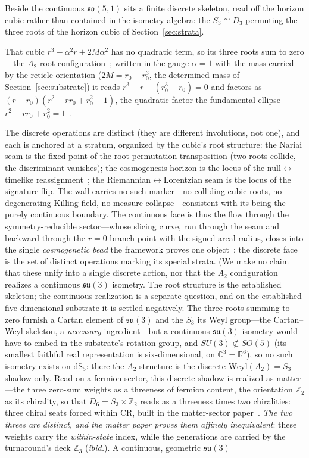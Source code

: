 \documentclass[11pt,a4paper]{article}
\theoremstyle{plain}
\theoremstyle{definition}
\theoremstyle{remark}
\newcommand{\so}{\mathfrak{so}}
\newcommand{\dS}{\mathrm{dS}}
\begin{document}
Beside the continuous $\so(5,1)$ sits a finite discrete skeleton, read off the horizon cubic rather than contained in the isometry algebra: the $S_3\cong D_3$ permuting the three roots of the horizon cubic of Section~\ref{sec:strata}. 

That cubic $r^3-\alpha^2 r+2M\alpha^2$ has no quadratic term, so its three roots sum to zero---the $A_2$ root configuration~\cite{Humphreys1972}; written in the gauge $\alpha=1$ with the mass carried by the reticle orientation ($2M=r_0-r_0^3$, the determined mass of Section~\ref{sec:substrate}) it reads $r^3-r-(r_0^3-r_0)=0$ and factors as $(r-r_0)(r^2+r r_0+r_0^2-1)$, the quadratic factor the fundamental ellipse $r^2+r r_0+r_0^2=1$~\cite{JanzenGroupoid,JanzenSlicing}. 

The discrete operations are distinct (they are different involutions, not one), and each is anchored at a stratum, organized by the cubic's root structure: the Nariai seam is the fixed point of the root-permutation transposition (two roots collide, the discriminant vanishes); the cosmogenesis horizon is the locus of the null$\leftrightarrow$timelike reassignment~\cite{JanzenCRframework}; the Riemannian$\leftrightarrow$Lorentzian seam is the locus of the signature flip. The wall carries no such marker---no colliding cubic roots, no degenerating Killing field, no measure-collapse---consistent with its being the purely continuous boundary. The continuous face is thus the flow through the symmetry-reducible sector---whose slicing curve, run through the seam and backward through the $r=0$ branch point with the signed areal radius, closes into the single \emph{cosmogenetic bead} the framework proves one object~\cite{JanzenCRframework}; the discrete face is the set of distinct operations marking its special strata. (We make no claim that these unify into a single discrete action, nor that the $A_2$ configuration realizes a continuous $\mathfrak{su}(3)$ isometry. The root structure is the established skeleton; the continuous realization is a separate question, and on the established five-dimensional substrate it is settled negatively. The three roots summing to zero furnish a Cartan element of $\mathfrak{su}(3)$ and the $S_3$ its Weyl group---the Cartan--Weyl skeleton, a \emph{necessary} ingredient---but a continuous $\mathfrak{su}(3)$ isometry would have to embed in the substrate's rotation group, and $SU(3)\not\subset SO(5)$ (its smallest faithful real representation is six-dimensional, on $\mathbb{C}^3=\mathbb{R}^6$), so no such isometry exists on $\dS_5$: there the $A_2$ structure is the discrete $\mathrm{Weyl}(A_2)=S_3$ shadow only. Read on a fermion sector, this discrete shadow is realized as matter---the three zero-sum weights as a threeness of fermion content, the orientation $\mathbb{Z}_2$ as its chirality, so that $D_6=S_3\times\mathbb{Z}_2$ reads as a threeness times two chiralities: three chiral seats forced within CR, built in the matter-sector paper~\cite{JanzenMatter}. \emph{The two threes are distinct, and the matter paper proves them affinely inequivalent}: these weights carry the \emph{within-state} index, while the generations are carried by the turnaround's deck $\mathbb{Z}_3$ (\emph{ibid.}). A continuous, geometric $\mathfrak{su}(3)$ 
\end{document}

